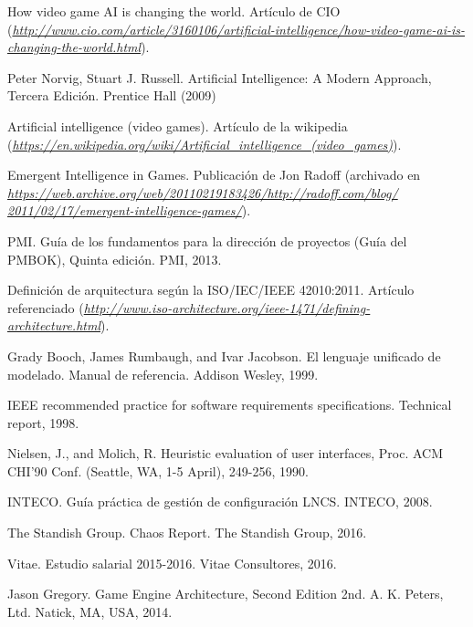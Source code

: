 

\begin{thebibliography}{99}
	
 How video game AI is changing the world. Artículo de CIO ({\it \url{http://www.cio.com/article/3160106/artificial-intelligence/how-video-game-ai-is-changing-the-world.html}}).

 Peter Norvig, Stuart J. Russell. Artificial Intelligence: A Modern Approach, Tercera Edición. Prentice Hall (2009)

 Artificial intelligence (video games). Artículo de la wikipedia (\textit{\url{https://en.wikipedia.org/wiki/Artificial\_intelligence\_(video\_games)}}).
	
Emergent Intelligence in Games. Publicación de Jon Radoff (archivado en \textit{\href{https://web.archive.org/web/20110219183426/http://radoff.com/blog/2011/02/17/emergent-intelligence-games/}{https://web.archive.org/web/20110219183426/http://radoff.com/blog/\\2011/02/17/emergent-intelligence-games/}}).
	
PMI. Guía de los fundamentos para la dirección de proyectos (Guía del PMBOK), Quinta edición. PMI, 2013. 	
	
 Definición de arquitectura según la ISO/IEC/IEEE 42010:2011. Artículo referenciado ({\it \url{http://www.iso-architecture.org/ieee-1471/defining-architecture.html}}).

Grady Booch, James Rumbaugh, and Ivar Jacobson. El lenguaje unificado de modelado. Manual
de referencia. Addison Wesley, 1999.

IEEE recommended practice for software requirements specifications. Technical report, 1998.

Nielsen, J., and Molich, R. Heuristic evaluation of user interfaces, Proc. ACM CHI'90 Conf. (Seattle, WA, 1-5 April), 249-256, 1990.

INTECO. Guía práctica de gestión de configuración LNCS. INTECO, 2008.

The Standish Group. Chaos Report. The Standish Group, 2016.

Vitae. Estudio salarial 2015-2016. Vitae Consultores, 2016.

Jason Gregory. Game Engine Architecture, Second Edition 2nd. A. K. Peters, Ltd. Natick, MA, USA, 2014.


\end{thebibliography}

